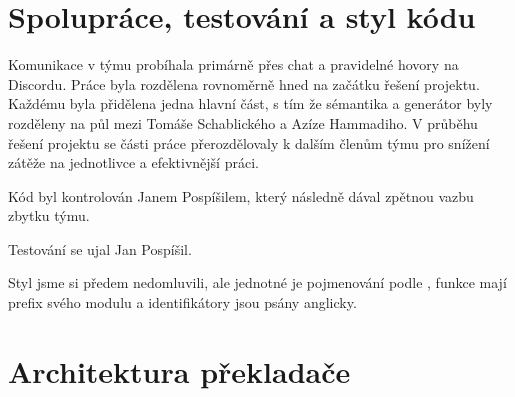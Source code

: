 \documentclass[11pt,a4paper]{article}
\begin{document}
\section{Spolupráce, testování a styl kódu}

Komunikace v týmu probíhala primárně přes chat a pravidelné hovory na Discordu.
Práce byla rozdělena rovnoměrně hned na začátku řešení projektu. Každému byla
přidělena jedna hlavní část, s tím že sémantika a generátor byly rozděleny na půl
mezi Tomáše Schablického a Azíze Hammadiho. V průběhu řešení projektu se části
práce přerozdělovaly k dalším členům týmu pro snížení zátěže na jednotlivce
a efektivnější práci.

Kód byl kontrolován Janem Pospíšilem, který následně dával zpětnou vazbu zbytku
týmu.

Testování se ujal Jan Pospíšil.

Styl jsme si předem nedomluvili, ale jednotné je pojmenování podle ,
funkce mají prefix svého modulu a identifikátory jsou psány anglicky.

\section{Architektura překladače}
\end{document}
